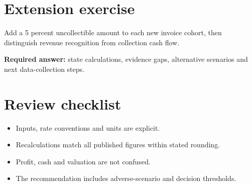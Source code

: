 \documentclass[11pt]{article}
\begin{document}
\section{Extension exercise}
Add a 5 percent uncollectible amount to each new invoice cohort, then distinguish revenue recognition from collection cash flow.\par\textbf{Required answer:} state calculations, evidence gaps, alternative scenarios and next data-collection steps.
\section{Review checklist}
\begin{itemize}[leftmargin=*,itemsep=3pt]
\item Inputs, rate conventions and units are explicit.
\item Recalculations match all published figures within stated rounding.
\item Profit, cash and valuation are not confused.
\item The recommendation includes adverse-scenario and decision thresholds.
\end{itemize}
\end{document}
